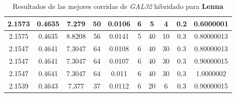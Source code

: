\begin{table}[h!]
\begin{center}
\begin{tabular}{|c|c|c|c|c|c|c|c|c|c|}
        \hline
        \hline
            2.1573 & 0.4635  & 7.279 & 50 & 0.0106 & 6 & 5 & 4 & 0.2 & 0.6000001\\
        \hline
        \hline
            2.1575 & 0.4635  & 8.8208 & 56 & 0.0141 & 5 & 40 & 10 & 0.3 & 0.80000013\\
        \hline
        \hline
            2.1547 & 0.4641  & 7.3047 & 64 & 0.0108 & 6 & 40 & 30 & 0.3 & 0.80000013\\
        \hline
        \hline
            2.1547 & 0.4641  & 7.3047 & 64 & 0.0107 & 6 & 40 & 30 & 0.3 & 0.90000015\\
        \hline
        \hline
            2.1547 & 0.4641  & 7.3047 & 64 & 0.011 & 6 & 40 & 30 & 0.3 & 1.0000002\\
        \hline
        \hline
            2.1539 & 0.4643  & 7.377 & 37 & 0.0112 & 6 & 20 & 6 & 0.3 & 0.90000015\\
        \hline
        \end{tabular}
        \caption{Resultados de las mejores corridas de \emph{GAL32} hibridado para {\bf Lenna}}
        \label{tb:tableGAL32}
    \end{center}
\end{table}
